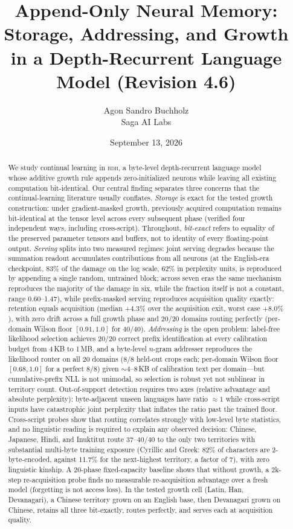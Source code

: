 \documentclass[11pt]{article}
\title{\bfseries Append-Only Neural Memory: Storage, Addressing, and Growth\\ \large in a Depth-Recurrent Language Model \textnormal{(Revision 4.6)}}
\author{Agon Sandro Buchholz\\\small Saga AI Labs}
\date{September 13, 2026}
\theoremstyle{definition}\newtheorem{definition}{Definition}
\theoremstyle{remark}\newtheorem{remark}{Remark}
\newcommand{\BDH}{\textsc{bdh}}
\begin{document}
\maketitle

\begin{abstract}
We study continual learning in \BDH{}, a byte-level depth-recurrent language
model~\cite{bdh} whose additive growth rule appends zero-initialized neurons while leaving all existing computation bit-identical. Our central finding separates three concerns that the continual-learning literature usually conflates.
\emph{Storage} is exact for the tested growth construction: under gradient-masked growth, previously acquired computation remains bit-identical at the tensor level across every subsequent phase (verified four independent ways, including cross-script). Throughout, \emph{bit-exact} refers to equality of the preserved parameter tensors and buffers, not to identity of every floating-point output.
\emph{Serving} splits into two measured regimes: joint serving degrades because the summation readout accumulates contributions from all neurons (at the English-era checkpoint, 83\% of the damage on the log scale, 62\% in perplexity units, is reproduced by appending a single random, untrained block; across seven eras the same mechanism reproduces the majority of the damage in six, while the fraction itself is not a constant, range 0.60--1.47), while prefix-masked serving reproduces acquisition quality exactly: retention equals acquisition (median $+4.3\%$ over the acquisition exit, worst case $+8.0\%$), with zero drift across a full growth phase and 20/20 domains routing perfectly (per-domain Wilson floor $[0.91,1.0]$ for 40/40).
\emph{Addressing} is the open problem: label-free likelihood selection achieves 20/20 correct prefix identification at every calibration budget from 4\,KB to 1\,MB, and a byte-level $n$-gram addresser reproduces the likelihood router on all 20 domains (8/8 held-out crops each; per-domain Wilson floor $[0.68, 1.0]$ for a perfect 8/8) given $\sim$4--8\,KB of calibration text per domain---but cumulative-prefix NLL is not unimodal, so selection is robust yet not sublinear in territory count. Out-of-support detection requires two axes (relative advantage and absolute perplexity): byte-adjacent unseen languages have ratio $\approx 1$ while cross-script inputs have catastrophic joint perplexity that inflates the ratio past the trained floor. Cross-script probes show that routing correlates strongly with low-level byte statistics, and no linguistic reading is required to explain any observed decision: Chinese, Japanese, Hindi, and Inuktitut route 37--40/40 to the only two territories with substantial multi-byte training exposure (Cyrillic and Greek: 82\% of characters are 2-byte-encoded, against 11.7\% for the next-highest territory, a factor of 7), with zero linguistic kinship. A 20-phase fixed-capacity baseline shows that without growth, a 2k-step re-acquisition probe finds no measurable re-acquisition advantage over a fresh model (forgetting is not access loss). In the tested growth cell (Latin, Han, Devanagari), a Chinese territory grown on an English base, then Devanagari grown on Chinese, retains all three bit-exactly, routes perfectly, and serves each at acquisition quality.

\end{abstract}
\end{document}
